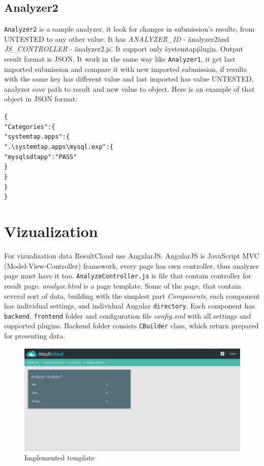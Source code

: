 \subsection{Analyzer2}

\texttt{Analyzer2} is a sample analyzer, it look for changes in submission's results, from UNTESTED to any other value. It has \emph{ANALYZER\_ID} - \"analyzer2\" and \emph{JS\_CONTROLLER} - \"analyzer2.js\". It support only \"systemtap\" plugin. Output result format is JSON. It work in the same way like \texttt{Analyzer1}, it get last imported submission and compare it with new imported submission, if results with the same key has different value and last imported has value UNTESTED, analyzer save path to result and new value to object. Here is an example of that object in JSON format:
\begin{alltt}
\{
    "Categories": \{
        "systemtap.apps": \{
            ".\textbackslash{}systemtap.apps\textbackslash{}mysql.exp": \{
                "mysql sdt app": "PASS"
            \}
        \}
    \}
\}
\end{alltt}

\section{Vizualization}

For vizualization data ResultCloud use AngularJS. AngularJS is JavaScript MVC (Model-View-Controller) framework, every page has own controller, thus analyzer page must have it too. \texttt{AnalyzeController.js} is file that contain controller for result page. \emph{analyze.html} is a page template. Some of the page, that contain several sort of data, building with the simplest part \emph{Components}, each component has individual settings, and individual Angular \texttt{directory}. Each component has \texttt{backend}, \texttt{frontend} folder and configuration file \emph{config.xml} with all settings and supported plugins. Backend folder consists \texttt{CBuilder} class, which return prepared for presenting data. 

\begin{figure}
  \centering
    \includegraphics[scale=0.3]{fig/temp_res.png}
  \caption{Implemented template}
  \label{fig:temp_res}
\end{figure}

